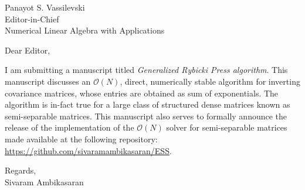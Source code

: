 \documentclass[a4paper,10pt]{letter}
\date{\today}
\begin{document}
\begin{letter}{Panayot S. Vassilevski\\
Editor-in-Chief\\
Numerical Linear Algebra with Applications}

\opening{Dear Editor,} %

\onehalfspacing

I am submitting a manuscript titled {\em Generalized Rybicki Press algorithm}. This manuscript discusses an $\mathcal{O}(N)$, direct, numerically stable algorithm for inverting covariance matrices, whose entries are obtained as sum of exponentials. The algorithm is in-fact true for a large class of structured dense matrices known as semi-separable matrices. This manuscript also serves to formally announce the release of the implementation of the $\mathcal{O}(N)$ solver for semi-separable matrices made available at the following repository: \url{https://github.com/sivaramambikasaran/ESS}.

\closing{Regards,\\
Sivaram Ambikasaran}


\end{letter}
\end{document}

